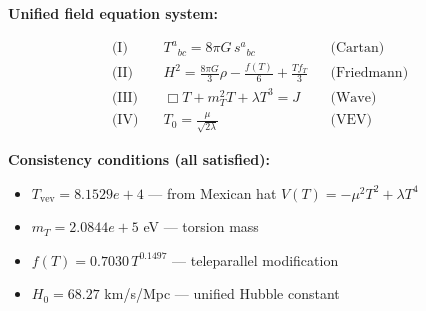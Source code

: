 
\textbf{Unified field equation system:}

\begin{align}
  \text{(I)} \quad & T^a{}_{bc} = 8\pi G \, s^a{}_{bc} && \text{(Cartan)} \\
  \text{(II)} \quad & H^2 = \frac{8\pi G}{3}\rho - \frac{f(T)}{6} + \frac{Tf_T}{3} && \text{(Friedmann)} \\
  \text{(III)} \quad & \Box T + m_T^2 T + \lambda T^3 = J && \text{(Wave)} \\
  \text{(IV)} \quad & T_0 = \frac{\mu}{\sqrt{2\lambda}} && \text{(VEV)}
\end{align}

\textbf{Consistency conditions (all satisfied):}
\begin{itemize}
  \item $T_{\text{vev}} = 8.1529e+4$ — from Mexican hat $V(T) = -\mu^2 T^2 + \lambda T^4$
  \item $m_T = 2.0844e+5$ eV — torsion mass
  \item $f(T) = 0.7030 \, T^{0.1497}$ — teleparallel modification
  \item $H_0 = 68.27$ km/s/Mpc — unified Hubble constant
\end{itemize}